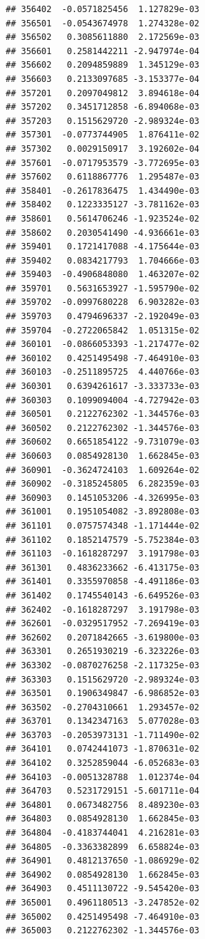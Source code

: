 \begin{frame}[fragile]
\begin{verbatim}
## 356402  -0.0571825456  1.127829e-03
## 356501  -0.0543674978  1.274328e-02
## 356502   0.3085611880  2.172569e-03
## 356601   0.2581442211 -2.947974e-04
## 356602   0.2094859889  1.345129e-03
## 356603   0.2133097685 -3.153377e-04
## 357201   0.2097049812  3.894618e-04
## 357202   0.3451712858 -6.894068e-03
## 357203   0.1515629720 -2.989324e-03
## 357301  -0.0773744905  1.876411e-02
## 357302   0.0029150917  3.192602e-04
## 357601  -0.0717953579 -3.772695e-03
## 357602   0.6118867776  1.295487e-03
## 358401  -0.2617836475  1.434490e-03
## 358402   0.1223335127 -3.781162e-03
## 358601   0.5614706246 -1.923524e-02
## 358602   0.2030541490 -4.936661e-03
## 359401   0.1721417088 -4.175644e-03
## 359402   0.0834217793  1.704666e-03
## 359403  -0.4906848080  1.463207e-02
## 359701   0.5631653927 -1.595790e-02
## 359702  -0.0997680228  6.903282e-03
## 359703   0.4794696337 -2.192049e-03
## 359704  -0.2722065842  1.051315e-02
## 360101  -0.0866053393 -1.217477e-02
## 360102   0.4251495498 -7.464910e-03
## 360103  -0.2511895725  4.440766e-03
## 360301   0.6394261617 -3.333733e-03
## 360303   0.1099094004 -4.727942e-03
## 360501   0.2122762302 -1.344576e-03
## 360502   0.2122762302 -1.344576e-03
## 360602   0.6651854122 -9.731079e-03
## 360603   0.0854928130  1.662845e-03
## 360901  -0.3624724103  1.609264e-02
## 360902  -0.3185245805  6.282359e-03
## 360903   0.1451053206 -4.326995e-03
## 361001   0.1951054082 -3.892808e-03
## 361101   0.0757574348 -1.171444e-02
## 361102   0.1852147579 -5.752384e-03
## 361103  -0.1618287297  3.191798e-03
## 361301   0.4836233662 -6.413175e-03
## 361401   0.3355970858 -4.491186e-03
## 361402   0.1745540143 -6.649526e-03
## 362402  -0.1618287297  3.191798e-03
## 362601  -0.0329517952 -7.269419e-03
## 362602   0.2071842665 -3.619800e-03
## 363301   0.2651930219 -6.323226e-03
## 363302  -0.0870276258 -2.117325e-03
## 363303   0.1515629720 -2.989324e-03
## 363501   0.1906349847 -6.986852e-03
## 363502  -0.2704310661  1.293457e-02
## 363701   0.1342347163  5.077028e-03
## 363703  -0.2053973131 -1.711490e-02
## 364101   0.0742441073 -1.870631e-02
## 364102   0.3252859044 -6.052683e-03
## 364103  -0.0051328788  1.012374e-04
## 364703   0.5231729151 -5.601711e-04
## 364801   0.0673482756  8.489230e-03
## 364803   0.0854928130  1.662845e-03
## 364804  -0.4183744041  4.216281e-03
## 364805  -0.3363382899  6.658824e-03
## 364901   0.4812137650 -1.086929e-02
## 364902   0.0854928130  1.662845e-03
## 364903   0.4511130722 -9.545420e-03
## 365001   0.4961180513 -3.247852e-02
## 365002   0.4251495498 -7.464910e-03
## 365003   0.2122762302 -1.344576e-03

\end{verbatim}
\end{frame}

